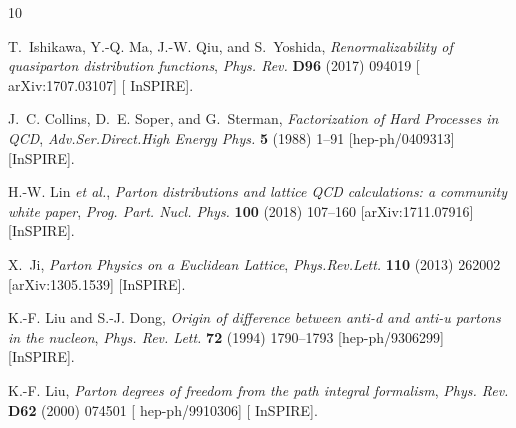 \providecommand{\href}[2]{#2}\begingroup\raggedright\begin{thebibliography}{10}

T.~Ishikawa, Y.-Q. Ma, J.-W. Qiu, and S.~Yoshida, {\it {Renormalizability of
  quasiparton distribution functions}},
\href{http://dx.doi.org/10.1103/PhysRevD.96.094019}{{\em Phys. Rev.} {\bfseries
  D96} (2017) 094019} [\href{http://arxiv.org/abs/1707.03107}{{\ttfamily
  arXiv:1707.03107}}] [\href{http://inspirehep.net/record/1609459}{{\ttfamily
  InSPIRE}}].

J.~C. Collins, D.~E. Soper, and G.~Sterman, {\it {Factorization of Hard
  Processes in QCD}},
{\em Adv.Ser.Direct.High Energy Phys.} {\bfseries 5} (1988) 1--91
  [\href{http://arxiv.org/abs/hep-ph/0409313}{{\ttfamily hep-ph/0409313}}]
  [\href{http://inspirehep.net/record/25808}{{\ttfamily InSPIRE}}].

H.-W. Lin {\em et al.}, {\it {Parton distributions and lattice QCD
  calculations: a community white paper}},
\href{http://dx.doi.org/10.1016/j.ppnp.2018.01.007}{{\em Prog. Part. Nucl.
  Phys.} {\bfseries 100} (2018) 107--160}
  [\href{http://arxiv.org/abs/1711.07916}{{\ttfamily arXiv:1711.07916}}]
  [\href{http://inspirehep.net/record/1637373}{{\ttfamily InSPIRE}}].

X.~Ji, {\it {Parton Physics on a Euclidean Lattice}},
\href{http://dx.doi.org/10.1103/PhysRevLett.110.262002}{{\em Phys.Rev.Lett.}
  {\bfseries 110} (2013) 262002}
  [\href{http://arxiv.org/abs/1305.1539}{{\ttfamily arXiv:1305.1539}}]
  [\href{http://inspirehep.net/record/1232221}{{\ttfamily InSPIRE}}].

K.-F. Liu and S.-J. Dong, {\it {Origin of difference between anti-d and anti-u
  partons in the nucleon}},
\href{http://dx.doi.org/10.1103/PhysRevLett.72.1790}{{\em Phys. Rev. Lett.}
  {\bfseries 72} (1994) 1790--1793}
  [\href{http://arxiv.org/abs/hep-ph/9306299}{{\ttfamily hep-ph/9306299}}]
  [\href{http://inspirehep.net/record/354824}{{\ttfamily InSPIRE}}].

K.-F. Liu, {\it {Parton degrees of freedom from the path integral formalism}},
\href{http://dx.doi.org/10.1103/PhysRevD.62.074501}{{\em Phys. Rev.} {\bfseries
  D62} (2000) 074501} [\href{http://arxiv.org/abs/hep-ph/9910306}{{\ttfamily
  hep-ph/9910306}}] [\href{http://inspirehep.net/record/508485}{{\ttfamily
  InSPIRE}}].


\end{thebibliography}
